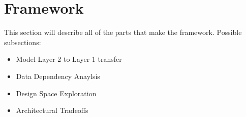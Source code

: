 \section{Framework}
This section will describe all of the parts that make the framework.
Possible subsections:
\begin{itemize}
\item Model Layer 2 to Layer 1 transfer
\item Data Dependency Anaylsis
\item Design Space Exploration
\item Architectural Tradeoffs
\end{itemize}

